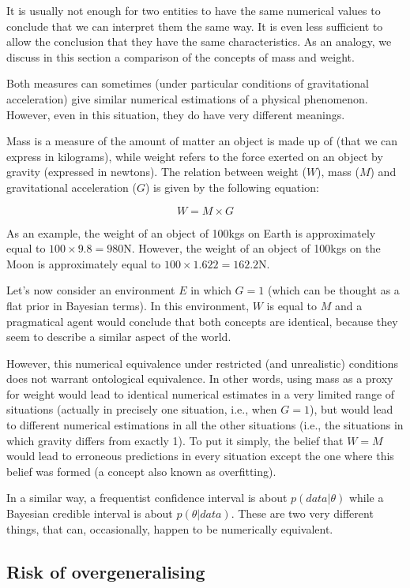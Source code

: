 \documentclass[a4paper,man,natbib,floatsintext,donotrepeattitle]{apa6}
\begin{document}
It is usually not enough for two entities to have the same numerical values to conclude that we can interpret them the same way. It is even less sufficient to allow the conclusion that they have the same characteristics. As an analogy, we discuss in this section a comparison of the concepts of mass and weight.

Both measures can sometimes (under particular conditions of gravitational acceleration) give similar numerical estimations of a physical phenomenon. However, even in this situation, they do have very different meanings.

Mass is a measure of the amount of matter an object is made up of (that we can express in kilograms), while weight refers to the force exerted on an object by gravity (expressed in newtons). The relation between weight ($W$), mass ($M$) and gravitational acceleration ($G$) is given by the following equation:

$$ W = M \times G $$

As an example, the weight of an object of 100kgs on Earth is approximately equal to $100 \times 9.8 = 980 \text{N}$. However, the weight of an object of 100kgs on the Moon is approximately equal to $100 \times 1.622 = 162.2\text{N}$.

Let's now consider an environment $E$ in which $G = 1$ (which can be thought as a flat prior in Bayesian terms). In this environment, $W$ is equal to $M$ and a pragmatical agent would conclude that both concepts are identical, because they seem to describe a similar aspect of the world.

However, this numerical equivalence under restricted (and unrealistic) conditions does not warrant ontological equivalence. In other words, using mass as a proxy for weight would lead to identical numerical estimates in a very limited range of situations (actually in precisely one situation, i.e., when $G = 1$), but would lead to different numerical estimations in all the other situations (i.e., the situations in which gravity differs from exactly 1). To put it simply, the belief that $W = M$ would lead to erroneous predictions in every situation except the one where this belief was formed (a concept also known as overfitting).

In a similar way, a frequentist confidence interval is about $p(data|\theta)$ while a Bayesian credible interval is about $p(\theta|data)$. These are two very different things, that can, occasionally, happen to be numerically equivalent.

\subsection{Risk of overgeneralising}
\end{document}

